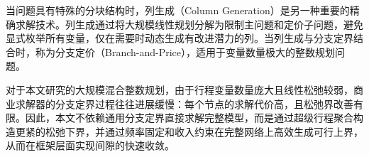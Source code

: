 当问题具有特殊的分块结构时，列生成（Column Generation）是另一种重要的精确求解技术\citep{desaulniers2005column, barnhart1998branch}。列生成通过将大规模线性规划分解为限制主问题和定价子问题，避免显式枚举所有变量，仅在需要时动态生成有改进潜力的列。当列生成与分支定界结合时，称为分支定价（Branch-and-Price），适用于变量数量极大的整数规划问题。

对于本文研究的大规模混合整数规划，由于行程变量数量庞大且线性松弛较弱，商业求解器的分支定界过程往往进展缓慢：每个节点的求解代价高，且松弛界改善有限。因此，本文不依赖通用分支定界直接求解完整模型，而是通过超级行程聚合构造更紧的松弛下界，并通过频率固定和收入约束在完整网络上高效生成可行上界，从而在框架层面实现间隙的快速收敛。
